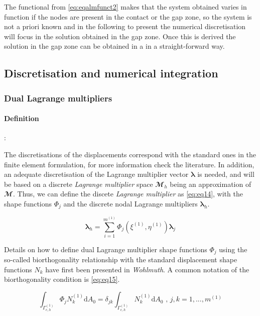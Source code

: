 \documentclass[a4paper,10pt]{article} %
\begin{document}
The functional from \eqref{eq:eqalmfunct2} makes that the system obtained varies in function if the nodes are present in the contact or the gap zone, so the system is not a priori known and in the following to present the numerical discretisation will focus in the solution obtained in the gap zone. Once this is derived the solution in the gap zone can be obtained in a in a straight-forward way.

\subsection{Discretisation and numerical integration}

\subsubsection{Dual Lagrange multipliers}

\paragraph{Definition}:

The discretisations of the displacements correspond with the standard ones in the finite element formulation, for more information check the literature\cite{Zienkiewicz1}. In addition, an adequate discretisation of the Lagrange multiplier vector $\boldsymbol{\lambda}$ is needed, and will be based on a discrete \textit{Lagrange multiplier} space $\mathbfcal{M}_h$ being an approximation of $\mathbfcal{M}$. Thus, we can define the discete \textit{Lagrange multiplier} as \eqref{eq:eq14}, with the shape functions $\Phi_j$ and the discrete nodal Lagrange multipliers $\boldsymbol{\lambda}_h$.

\begin{equation}\label{eq:eq14}
 \boldsymbol{\lambda}_h = \sum_{i=1}^{m^{(1)}} \Phi_j\left(\xi^{(1)},\eta^{(1)} \right) \boldsymbol{\lambda}_j
\end{equation}

Details on how to define dual Lagrange multiplier shape functions $\Phi_j$ using the so-called biorthogonality relationship with the standard displacement shape functions $N_k$ have first been presented in \textit{Wohlmuth}\cite{wohlmuth}. A common notation of the biorthogonality condition is \eqref{eq:eq15}.

\begin{equation}\label{eq:eq15}
 \int_{\Gamma_{c,h}^{(1)}}\Phi_j N_k^{(1)} \text{d}A_0 = \delta_{jk} \int_{\Gamma_{c,h}^{(1)}} N_k^{(1)} \text{d}A_0 \text{ , } j,k=1,...,m^{(1)}
\end{equation}
\end{document}
